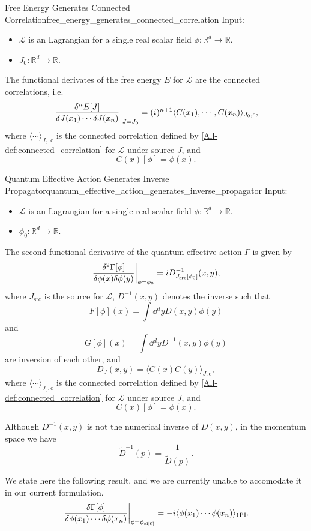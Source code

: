 \documentclass{article}
\begin{document}
\begin{theorem}{Free Energy Generates Connected Correlation}{free_energy_generates_connected_correlation}
    Input:
    \begin{itemize}
        \item $\mathcal{L}$ is an Lagrangian for a single real scalar field $\phi: \mathbb{R}^d \rightarrow \mathbb{R}$.
        \item $J_0: \mathbb{R}^{d} \rightarrow \mathbb{R}$.
    \end{itemize}
    The functional derivates of the free energy $E$ for $\mathcal{L}$ are the connected correlations, i.e.
    \[ \eval{\frac{\delta^n E[J]}{\delta J(x_1) \cdots \delta J(x_n)}}_{J=J_0} = (i)^{n+1} \langle C(x_1), \cdots, C(x_n) \rangle_{J_0,\mathrm{c}}, \]
    where $\langle {\cdots} \rangle_{J_0,\mathrm{c}}$ is the connected correlation defined by \cref{All-def:connected_correlation} for $\mathcal{L}$ under source $J$, and
    \[ C(x)[\phi] = \phi(x). \]
\end{theorem}

\begin{theorem}{Quantum Effective Action Generates Inverse Propagator}{quantum_effective_action_generates_inverse_propagator}
    Input:
    \begin{itemize}
        \item $\mathcal{L}$ is an Lagrangian for a single real scalar field $\phi: \mathbb{R}^d \rightarrow \mathbb{R}$.
        \item $\phi_0: \mathbb{R}^{d} \rightarrow \mathbb{R}$.
    \end{itemize}
    The second functional derivative of the quantum effective action $\Gamma$ is given by
    \[ \eval{\frac{\delta^2 \Gamma[\phi]}{\delta \phi(x) \delta \phi(y)}}_{\phi = \phi_0} = iD^{-1}_{J_{\mathrm{src}}[\phi_0]}(x, y), \]
    where $J_{\mathrm{src}}$ is the source for $\mathcal{L}$, $D^{-1}(x,y)$ denotes the inverse such that
    \[ F[\phi](x) = \int \dd{^d y} D(x, y)\phi(y) \]
    and
    \[ G[\phi](x) = \int \dd{^d y} D^{-1}(x, y)\phi(y) \]
    are inversion of each other,
    and
    \[ D_J(x,y) = \langle C(x) C(y) \rangle_{J,\mathrm{c}}, \]
    where $\langle {\cdots} \rangle_{J_0,\mathrm{c}}$ is the connected correlation defined by \cref{All-def:connected_correlation} for $\mathcal{L}$ under source $J$, and
    \[ C(x)[\phi] = \phi(x). \]
\end{theorem}

Although $D^{-1}(x,y)$ is not the numerical inverse of $D(x,y)$, in the momentum space we have
\[ \tilde{D}^{-1}(p) = \frac{1}{\tilde{D}(p)}. \]
\par
We state here the following result, and we are currently unable to accomodate it in our current formulation.
\[ \eval{\frac{\delta \Gamma[\phi]}{\delta\phi(x_1)\cdots \delta\phi(x_n)}}_{\phi=\phi_{\mathrm{cl}[0]}} = -i\langle \phi(x_1) \cdots \phi(x_n) \rangle_{\mathrm{1PI}}. \]
\end{document}

